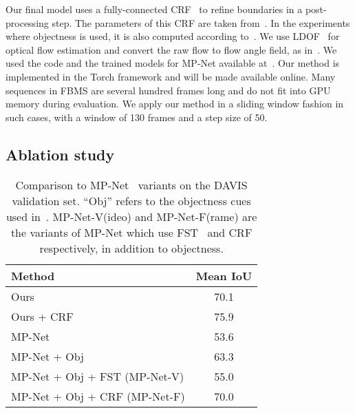 \documentclass[10pt,twocolumn,letterpaper]{article}
\begin{document}
Our final model uses a fully-connected CRF~\cite{krahenbuhl2011efficient} to
refine boundaries in a post-processing step. The parameters of this CRF are
taken from~\cite{tokmakov2016learning}. In the experiments where objectness is
used, it is also computed according to~\cite{tokmakov2016learning}. We use
LDOF~\cite{Brox11a} for optical flow estimation and convert the raw flow to
flow angle field, as in~\cite{tokmakov2016learning}. We used the code and
the trained models for MP-Net available at~\cite{tokmakov2016web}. Our
method is implemented in the Torch framework and will be made available online.
Many sequences in FBMS are several hundred frames long and do not fit into GPU
memory during evaluation. We apply our method in a sliding window fashion in
such cases, with a window of 130 frames and a step size of 50.

\subsection{Ablation study}
\label{sec:abl}
\begin{table}[t]
\begin{center}
\begin{tabular}{l|c}
\hline
Method & Mean IoU  \\
\hline
  Ours         & 70.1 \\
  Ours + CRF   & 75.9 \\
  \hline
  MP-Net       & 53.6 \\
  MP-Net + Obj & 63.3 \\  
  MP-Net + Obj + FST (MP-Net-V) & 55.0 \\
  MP-Net + Obj + CRF (MP-Net-F) & 70.0 \\
\hline
\end{tabular}
\vspace{0.1cm}
\caption{Comparison to MP-Net~\cite{tokmakov2016learning} variants on the DAVIS
validation set. ``Obj'' refers to the objectness cues used
in~\cite{tokmakov2016learning}. MP-Net-V(ideo) and MP-Net-F(rame) are the variants
of MP-Net which use FST~\cite{papazoglou2013fast} and CRF respectively, in
addition to objectness.}
\label{tbl:mpn}
\vspace{-0.6cm}
\end{center}
\end{table}
\end{document}
